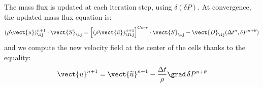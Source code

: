The mass flux is updated at each iteration step, using $\delta(\delta P)$. At convergence, the updated mass flux equation is:
\begin{equation}
(\rho \vect{u})^{n+1}_{\ij} \cdot \vect{S}_{\ij} =
\left[(\rho
\vect{\widetilde{u}})^{n+1}_{\fij}\right]^{Corr} \cdot \vect{S}_{\ij}-\vect{D}_{\ij}(\Delta
t^n,\delta P^{n+\theta})
\end{equation}
and we compute the new velocity field at the center of the cells thanks
to the equality:
%
\begin{equation}
\vect{u}^{n+1} =
\vect{\widetilde{u}}^{n+1}-\frac{\Delta t}{\rho}\grad \,\delta P^{n+\theta}
\end{equation}
%

